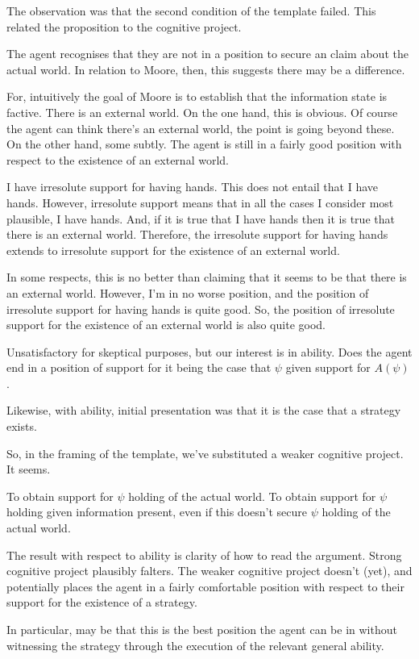 \documentclass[10pt]{article}
\begin{document}
\begin{note}
  The observation was that the second condition of the template failed.
  This related the proposition to the cognitive project.

  The agent recognises that they are not in a position to secure an claim about the actual world.
  In relation to Moore, then, this suggests there may be a difference.

  For, intuitively the goal of Moore is to establish that the information state is factive.
  There is an external world.
  On the one hand, this is obvious.
  Of course the agent can think there's an external world, the point is going beyond these.
  On the other hand, some subtly.
  The agent is still in a fairly good position with respect to the existence of an external world.

  {
    \color{red}
    I have irresolute support for having hands.
    This does not entail that I have hands.
    However, irresolute support means that in all the cases I consider most plausible, I have hands.
    And, if it is true that I have hands then it is true that there is an external world.
    Therefore, the irresolute support for having hands extends to irresolute support for the existence of an external world.

    In some respects, this is no better than claiming that it seems to be that there is an external world.
    However, I'm in no worse position, and the position of irresolute support for having hands is quite good.
    So, the position of irresolute support for the existence of an external world is also quite good.

    Unsatisfactory for skeptical purposes, but our interest is in ability.
    Does the agent end in a position of support for it being the case that \(\psi\) given support for \(A(\psi)\).
  }

  Likewise, with ability, initial presentation was that it is the case that a strategy exists.

  So, in the framing of the template, we've substituted a weaker cognitive project.
  It seems.

  To obtain support for \(\psi\) holding of the actual world.
  To obtain support for \(\psi\) holding given information present, even if this doesn't secure \(\psi\) holding of the actual world.
\end{note}

\begin{note}
  The result with respect to ability is clarity of how to read the argument.
  Strong cognitive project plausibly falters.
  The weaker cognitive project doesn't (yet), and potentially places the agent in a fairly comfortable position with respect to their support for the existence of a strategy.

  In particular, may be that this is the best position the agent can be in without witnessing the strategy through the execution of the relevant general ability.
\end{note}
\end{document}
